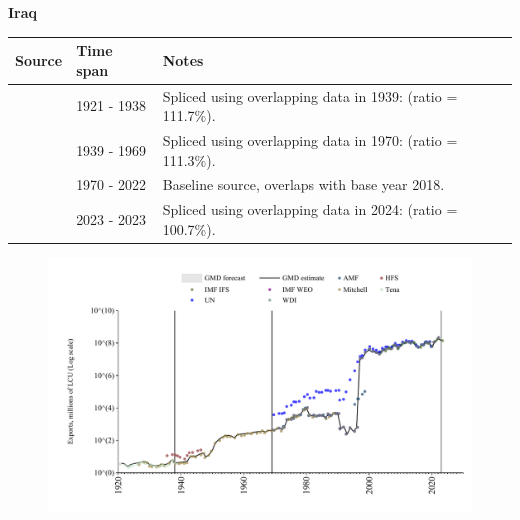 \documentclass[12pt,a4paper,landscape]{article}
\begin{document}
\begin{adjustbox}{max totalsize={\paperwidth}{\paperheight},center}
\begin{minipage}[t][\textheight][t]{\textwidth}
\vspace*{0.5cm}
{}
\begin{center}
{\Large\bfseries Iraq}
\end{center}
\vspace{0.5cm}
\begin{table}[H]
\centering
\small
\begin{tabular}{|l|l|l|}
\hline
\textbf{Source} & \textbf{Time span} & \textbf{Notes} \\
\hline
\rowcolor{white}\cite{Tena}& 1921 - 1938 &Spliced using overlapping data in 1939: (ratio = 111.7\%).\\
\rowcolor{lightgray}\cite{Mitchell}& 1939 - 1969 &Spliced using overlapping data in 1970: (ratio = 111.3\%).\\
\rowcolor{white}\cite{WDI}& 1970 - 2022 &Baseline source, overlaps with base year 2018.\\
\rowcolor{lightgray}\cite{IMF_IFS}& 2023 - 2023 &Spliced using overlapping data in 2024: (ratio = 100.7\%).\\
\hline
\end{tabular}
\end{table}
\begin{figure}[H]
\centering
\includegraphics[width=\textwidth,height=0.6\textheight,keepaspectratio]{graphs/IRQ_exports.pdf}
\end{figure}
\end{minipage}
\end{adjustbox}
\end{document}
